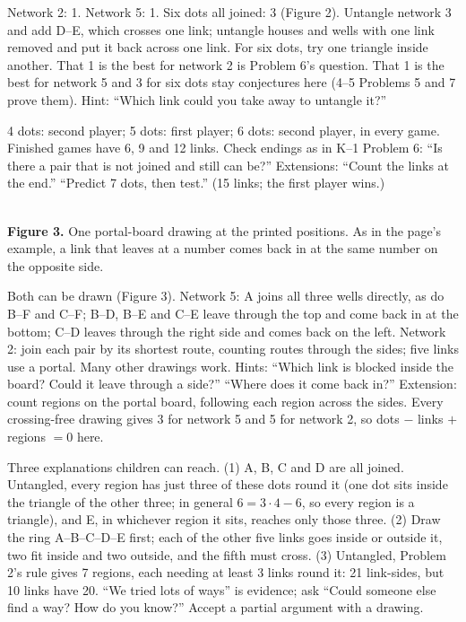 Network 2: 1. Network 5: 1. Six dots all joined: 3 (Figure 2). Untangle network 3 and add D--E, which crosses one link; untangle houses and wells with one link removed and put it back across one link. For six dots, try one triangle inside another. That 1 is the best for network 2 is Problem 6's question. That 1 is the best for network 5 and 3 for six dots stay conjectures here (4--5 Problems 5 and 7 prove them). Hint: ``Which link could you take away to untangle it?''

4 dots: second player; 5 dots: first player; 6 dots: second player, in every game. Finished games have 6, 9 and 12 links. Check endings as in K--1 Problem 6: ``Is there a pair that is not joined and still can be?'' Extensions: ``Count the links at the end.'' ``Predict 7 dots, then test.'' (15 links; the first player wins.)

\begin{center}
\qquad\qquad{}\\[4pt]
{\small\textbf{Figure 3.} One portal-board drawing at the printed positions. As in the page's example, a link that leaves at a number comes back in at the same number on the opposite side.}
\end{center}

Both can be drawn (Figure 3). Network 5: A joins all three wells directly, as do B--F and C--F; B--D, B--E and C--E leave through the top and come back in at the bottom; C--D leaves through the right side and comes back on the left. Network 2: join each pair by its shortest route, counting routes through the sides; five links use a portal. Many other drawings work. Hints: ``Which link is blocked inside the board? Could it leave through a side?'' ``Where does it come back in?'' Extension: count regions on the portal board, following each region across the sides. Every crossing-free drawing gives 3 for network 5 and 5 for network 2, so dots $-$ links $+$ regions $=0$ here.

Three explanations children can reach. (1) A, B, C and D are all joined. Untangled, every region has just three of these dots round it (one dot sits inside the triangle of the other three; in general $6=3\cdot4-6$, so every region is a triangle), and E, in whichever region it sits, reaches only those three. (2) Draw the ring A--B--C--D--E first; each of the other five links goes inside or outside it, two fit inside and two outside, and the fifth must cross. (3) Untangled, Problem 2's rule gives 7 regions, each needing at least 3 links round it: 21 link-sides, but 10 links have 20. ``We tried lots of ways'' is evidence; ask ``Could someone else find a way? How do you know?'' Accept a partial argument with a drawing.

